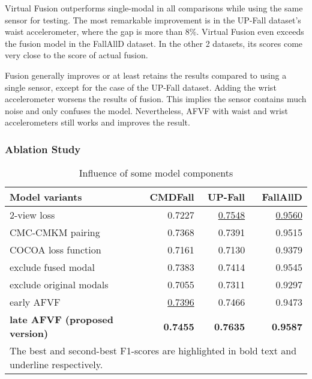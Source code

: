 \documentclass[conference]{IEEEtran}
\begin{document}
Virtual Fusion outperforms single-modal in all comparisons while using the same sensor for testing. The most remarkable improvement is in the UP-Fall dataset's waist accelerometer, where the gap is more than 8\%. Virtual Fusion even exceeds the fusion model in the FallAllD dataset. In the other 2 datasets, its scores come very close to the score of actual fusion.

Fusion generally improves or at least retains the results compared to using a single sensor, except for the case of the UP-Fall dataset. Adding the wrist accelerometer worsens the results of fusion. This implies the sensor contains much noise and only confuses the model. Nevertheless, AFVF with waist and wrist accelerometers still works and improves the result.

\subsubsection{Ablation Study}
\label{subsec: ablation}

\begin{table}
\caption{Influence of some model components}
\label{tab: ablation}
\centering
\begin{tabular}{@{}lrrr@{}}
\toprule
\textbf{Model variants} & \textbf{CMDFall} & \textbf{UP-Fall} & \textbf{FallAllD} \\ \midrule
2-view loss & 0.7227 & \underline{0.7548} & \underline{0.9560} \\
CMC-CMKM pairing & 0.7368 & 0.7391 & 0.9515 \\
COCOA loss function & 0.7161 & 0.7130 & 0.9379 \\
exclude fused modal & 0.7383 & 0.7414 & 0.9545 \\
exclude original modals & 0.7055 & 0.7311 & 0.9297 \\
early AFVF & \underline{0.7396} & 0.7466 & 0.9473 \\
\textbf{late AFVF (proposed version)} & \textbf{0.7455} & \textbf{0.7635} & \textbf{0.9587} \\ \bottomrule
\multicolumn{4}{p{210pt}}{The best and second-best F1-scores are highlighted in bold text and underline respectively.}
\end{tabular}
\end{table}
\end{document}
